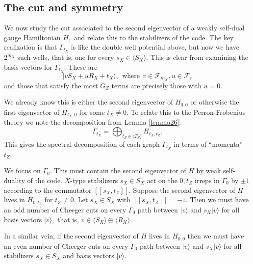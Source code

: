 \documentclass[a4paper,onecolumn,11pt,unpublished]{quantumarticle}
\newcommand{\ket}[1]{|{#1}\rangle}
\def\Span#1{\langle #1 \rangle}
\def\smbox#1{\ \ \mbox{#1}\ \ }
\newcommand{\Field}{\mathcal{F}}
\def\Frd{\Field_{r}}
\begin{document}


\subsection{The cut and symmetry}\label{Sec72}

We now study 
the cut associated to the second eigenvector of a 
weakly self-dual gauge Hamiltonian $H,$
and relate this to the stabilizers of the code.
The key realization is that $\Gamma_{t_X}$ is like
the double well potential above,
but now we have $2^{m_X}$ such wells,
that is, one for every $s_X\in \Span{S_X}.$
This is clear from examining the basis vectors for $\Gamma_{t_X}.$
These are 
$$
    \ket{v S_X + u R_X + t_X}, \smbox{where} v\in \Field_{m_X}, u\in\Frd
$$
and those that satisfy the most $G_Z$ terms are
precisely those with $u=0.$

We already know this is either the second eigenvector of $H_{0,0}$
or otherwise the first eigenvector of $H_{t_X,0}$ for some $t_X \ne 0.$
To relate this to the Perron-Frobenius theory we note the 
decomposition from Lemma \ref{lemma26}:
$$
    \Gamma_{t_X} = \bigoplus_{t_Z\in\Span{T_Z}} H_{t_X, t_Z}.
$$
This gives the spectral decomposition of each graph $\Gamma_{t_X}$ 
in terms of ``momenta'' $t_Z.$

We focus on $\Gamma_0.$
This must contain the second eigenvector of $H$ by weak self-duality of the code.
$X$-type stabilizers $s_X\in S_X$ act on the $0,t_Z$ irreps in $\Gamma_0$
by $\pm 1$ according to the commutator $[[s_X, t_Z]].$
Suppose the second eigenvector of $H$ lives in
$H_{0,t_Z}$ for $t_Z\ne 0$. 
Let $s_X\in S_X$ with $[[s_X, t_Z]]=-1.$
Then we must have an odd number of Cheeger cuts 
on every $\Gamma_0$ path between $\ket{v}$ and $s_X\ket{v}$ for all basis
vectors $\ket{v},$ that is, $v\in\Span{S_X}\oplus\Span{R_X}.$

In a similar vein, if the second eigenvector of $H$ lives in $H_{0,0}$
then we must have an even number of Cheeger cuts 
on every $\Gamma_0$ path between $\ket{v}$ and $s_X\ket{v}$ for all stabilizers $s_X\in S_X$
and basis vectors $\ket{v}.$
\end{document}
